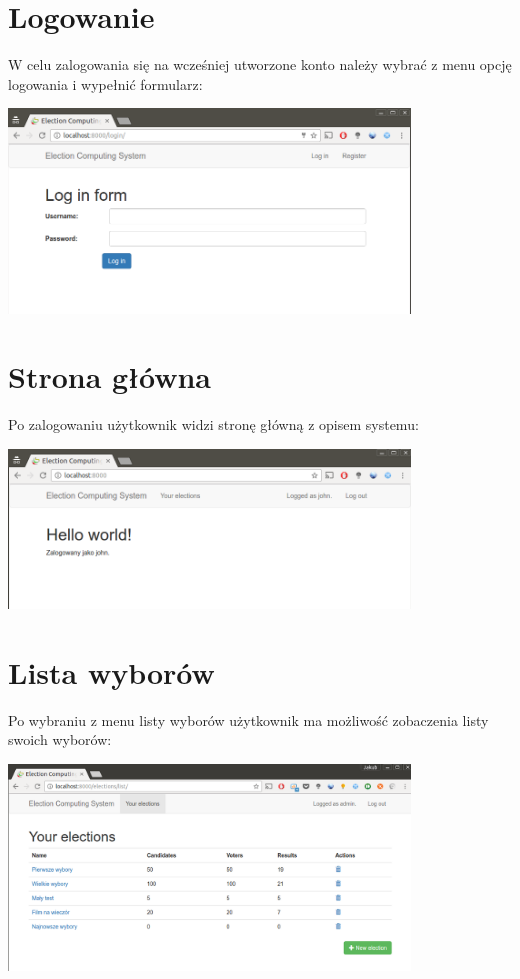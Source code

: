 \documentclass[pdflatex,11pt]{../aghdoc}
\begin{document}
\newpage
\section{Logowanie}
\label{sec:logowanie}

W celu zalogowania się na wcześniej utworzone konto należy wybrać z menu opcję logowania i wypełnić formularz:

\includegraphics[width=0.8\textwidth]{pics/login.png}


\section{Strona główna}
\label{sec:stronaglowna}

Po zalogowaniu użytkownik widzi stronę główną z opisem systemu:

\includegraphics[width=0.8\textwidth]{pics/mainpage.png}


\newpage
\section{Lista wyborów}
\label{sec:electionslist}

Po wybraniu z menu listy wyborów użytkownik ma możliwość zobaczenia listy swoich wyborów:

\includegraphics[width=0.8\textwidth]{pics/elections-list.png}
\end{document}

